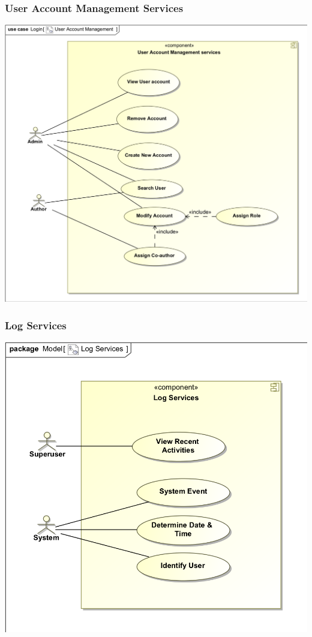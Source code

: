 \documentclass[11pt]{article}
\begin{document}
	\subsubsection{User Account Management Services}
	\begin{center}
		\includegraphics[width=\textwidth]{../Diagrams/UseCases/UserAccountManagementServices_UseCase.png}\\[0.5cm]
	\end{center}
	\newpage
	\subsubsection{Log Services}
	\begin{center}
		\includegraphics[width=\textwidth]{../Diagrams/UseCases/LogServices_UseCase.png}\\[0.5cm]
	\end{center}
	\newpage
\end{document}
